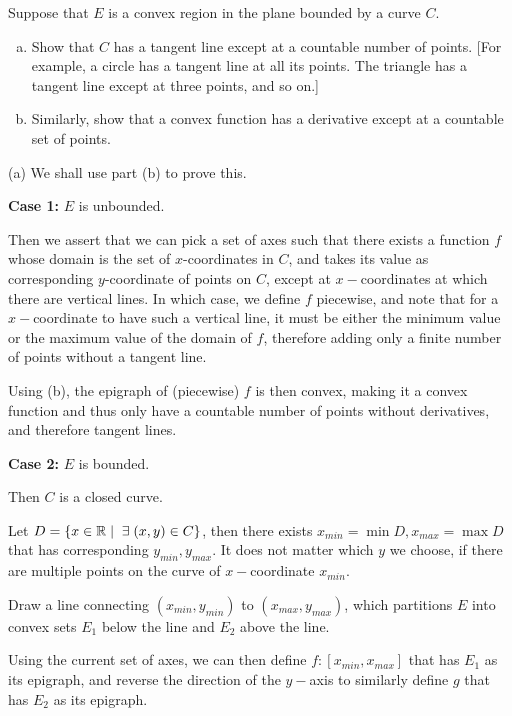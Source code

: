 \documentclass[a4paper, 11pt]{article}
\begin{document}
\begin{problem} [1.32*]
Suppose that $E$ is a convex region in the plane bounded by a curve $C$. \begin{enumerate} [(a)]
    \item Show that $C$ has a tangent line except at a countable number of points. [For example, a circle has a tangent line at all its points. The triangle has a tangent line except at three points, and so on.]
    \item Similarly, show that a convex function has a derivative except at a countable set of points.
\end{enumerate}
\end{problem}
\begin{solution}
    (a) We shall use part (b) to prove this.

    \textbf{Case 1: }$E$ is unbounded. 

    Then we assert that we can pick a set of axes such that there exists a function $f$ whose domain is the set of $x$-coordinates in $C$, and takes its value as corresponding $y$-coordinate of points on $C$, except at $x-$coordinates at which there are vertical lines. In which case, we define $f$ piecewise, and note that for a $x-$coordinate to have such a vertical line, it must be either the minimum value or the maximum value of the domain of $f$, therefore adding only a finite number of points without a tangent line.

    Using (b), the epigraph of (piecewise) $f$ is then convex, making it a convex function and thus only have a countable number of points without derivatives, and therefore tangent lines.

    \textbf{Case 2:} $E$ is bounded.

    Then $C$ is a closed curve.
    
    Let $D = \{x \in \bbr \mid \exists (x, y) \in C\}$, then there exists $x_{min} = \min D, x_{max} = \max D$ that has corresponding $y_{min}, y_{max}$. It does not matter which $y$ we choose, if there are multiple points on the curve of $x-$coordinate $x_{min}$.

    Draw a line connecting $(x_{min}, y_{min})$ to $(x_{max}, y_{max})$, which partitions $E$ into convex sets $E_1$ below the line and $E_2$ above the line.

    Using the current set of axes, we can then define $f: [x_{min}, x_{max}]$ that has $E_1$ as its epigraph, and reverse the direction of the $y-$axis to similarly define $g$ that has $E_2$ as its epigraph.


\end{solution}
\end{document}
